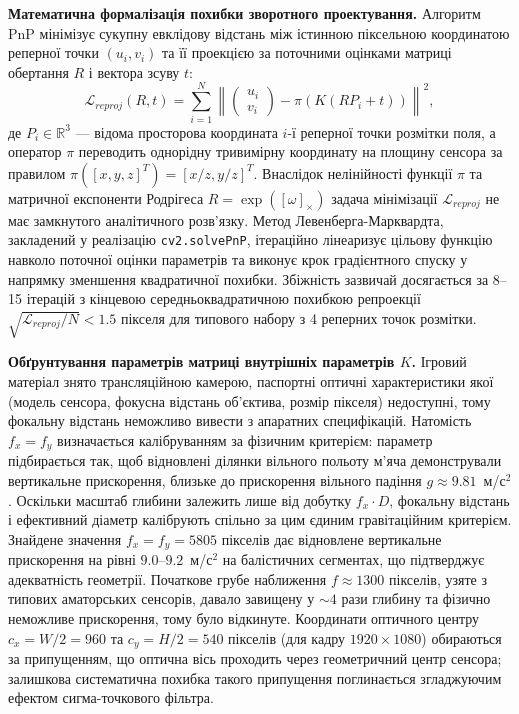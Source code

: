\textbf{Математична формалізація похибки зворотного проектування.} Алгоритм
\gls{PnP} мінімізує сукупну евклідову відстань між істинною піксельною
координатою реперної точки $(u_i, v_i)$ та її проекцією за поточними
оцінками матриці обертання $R$ і вектора зсуву $t$:
\begin{equation}\mathcal{L}_{reproj}(R, t) = \sum_{i=1}^{N} \left\| \begin{pmatrix} u_i \\ v_i \end{pmatrix} - \pi\left( K (R P_i + t) \right) \right\|^2,\end{equation}
де $P_i \in \mathbb{R}^3$ --- відома просторова координата $i$-ї реперної точки розмітки
поля, а оператор $\pi$ переводить однорідну тривимірну координату на площину сенсора за
правилом $\pi([x, y, z]^T) = [x/z, y/z]^T$. Внаслідок нелінійності функції $\pi$ та
матричної експоненти Родрігеса $R = \exp([\omega]_\times)$ задача мінімізації
$\mathcal{L}_{reproj}$ не має замкнутого аналітичного розв'язку. Метод Левенберга-Марквардта,
закладений у реалізацію \texttt{cv2.solvePnP}, ітераційно лінеаризує цільову функцію
навколо поточної оцінки параметрів та виконує крок градієнтного спуску у напрямку
зменшення квадратичної похибки. Збіжність зазвичай досягається за 8--15 ітерацій з
кінцевою середньоквадратичною похибкою репроекції $\sqrt{\mathcal{L}_{reproj}/N} < 1.5$
пікселя для типового набору з 4 реперних точок розмітки.

\textbf{Обґрунтування параметрів матриці внутрішніх параметрів $K$.} Ігровий
матеріал знято трансляційною камерою, паспортні оптичні характеристики якої
(модель сенсора, фокусна відстань об'єктива, розмір пікселя) недоступні, тому
фокальну відстань неможливо вивести з апаратних специфікацій. Натомість
$f_x = f_y$ визначається калібруванням за фізичним критерієм: параметр
підбирається так, щоб відновлені ділянки вільного польоту м'яча демонстрували
вертикальне прискорення, близьке до прискорення вільного падіння
$g \approx 9.81$~м/с$^2$. Оскільки масштаб глибини залежить лише від добутку
$f_x \cdot D$, фокальну відстань і ефективний діаметр калібрують спільно за цим
єдиним гравітаційним критерієм. Знайдене значення $f_x = f_y = 5805$ пікселів
дає відновлене вертикальне прискорення на рівні $9.0$--$9.2$~м/с$^2$ на
балістичних сегментах, що підтверджує адекватність геометрії. Початкове грубе
наближення $f \approx 1300$ пікселів, узяте з типових аматорських сенсорів,
давало завищену у $\sim 4$ рази глибину та фізично неможливе прискорення, тому
було відкинуте. Координати оптичного центру $c_x = W/2 = 960$ та $c_y = H/2 = 540$
пікселів (для кадру $1920 \times 1080$) обираються за припущенням, що оптична
вісь проходить через геометричний центр сенсора; залишкова систематична похибка
такого припущення поглинається згладжуючим ефектом сигма-точкового фільтра.

